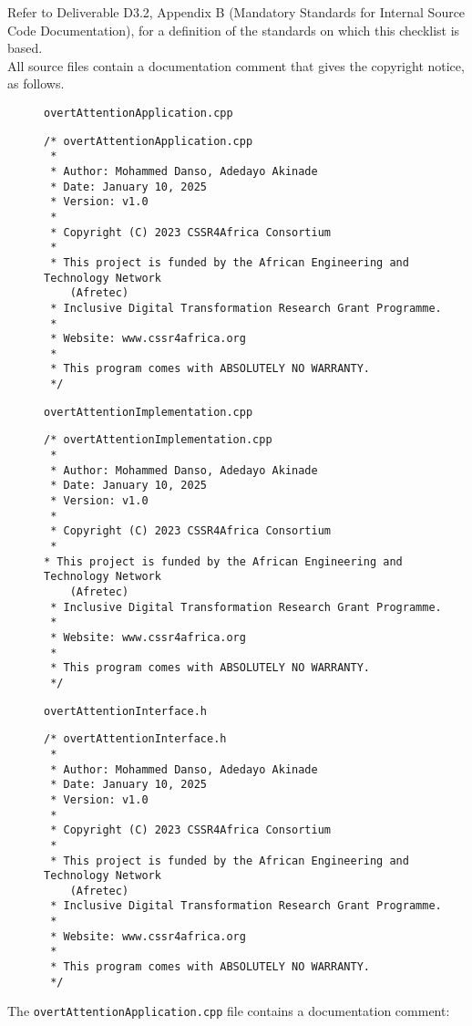 \documentclass{CSSRforAfrica}
\newcommand{\blank}{~\\}
\newcommand{\checkboxChecked}{\fbox{\ding{51}}} %
\begin{document}
Refer to Deliverable D3.2, Appendix B (Mandatory Standards for Internal Source Code Documentation), for a definition of the standards on which this checklist is based.\\

\noindent All source files contain a documentation comment that gives the copyright notice, as follows.
 
\begin{description}

\item[\checkboxChecked] {\small \verb+overtAttentionApplication.cpp+}  
{\small \begin{verbatim}
/* overtAttentionApplication.cpp
 *
 * Author: Mohammed Danso, Adedayo Akinade
 * Date: January 10, 2025
 * Version: v1.0
 * 
 * Copyright (C) 2023 CSSR4Africa Consortium
 * 
 * This project is funded by the African Engineering and Technology Network 
    (Afretec) 
 * Inclusive Digital Transformation Research Grant Programme. 
 *
 * Website: www.cssr4africa.org
 *
 * This program comes with ABSOLUTELY NO WARRANTY.
 */
\end{verbatim} }

\newpage
\item[\checkboxChecked]  {\small \verb+overtAttentionImplementation.cpp+}  
{\small \begin{verbatim}
/* overtAttentionImplementation.cpp
 *
 * Author: Mohammed Danso, Adedayo Akinade
 * Date: January 10, 2025
 * Version: v1.0
 * 
 * Copyright (C) 2023 CSSR4Africa Consortium
 * 
* This project is funded by the African Engineering and Technology Network 
    (Afretec) 
 * Inclusive Digital Transformation Research Grant Programme. 
 *
 * Website: www.cssr4africa.org
 *
 * This program comes with ABSOLUTELY NO WARRANTY.
 */
\end{verbatim} }

\item[\checkboxChecked] {\small \verb+overtAttentionInterface.h+}   
{\small \begin{verbatim}
/* overtAttentionInterface.h
 *
 * Author: Mohammed Danso, Adedayo Akinade
 * Date: January 10, 2025
 * Version: v1.0
 * 
 * Copyright (C) 2023 CSSR4Africa Consortium
 * 
 * This project is funded by the African Engineering and Technology Network 
    (Afretec) 
 * Inclusive Digital Transformation Research Grant Programme. 
 *
 * Website: www.cssr4africa.org
 *
 * This program comes with ABSOLUTELY NO WARRANTY.
 */
\end{verbatim} }


\end{description} 
%
\newpage
\noindent The {\small \verb+overtAttentionApplication.cpp+} file contains a documentation comment:
\end{document}
